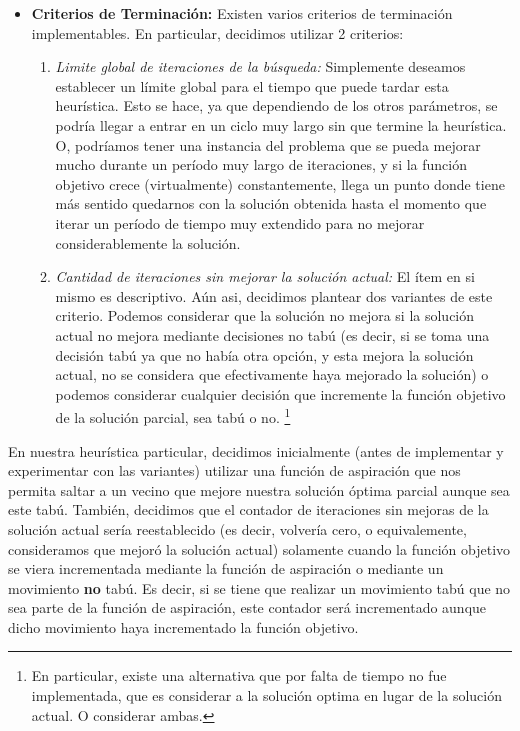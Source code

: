 \begin{itemize}
    \item \textbf{Criterios de Terminaci\'on: } Existen varios criterios
        de terminaci\'on implementables. En particular, decidimos utilizar
        2 criterios:
        \begin{enumerate}
            \item \emph{Limite global de iteraciones de la b\'usqueda: } Simplemente
                deseamos establecer un l\'imite global para el tiempo que puede
                tardar esta heur\'istica. Esto se hace, ya que dependiendo de los
                otros par\'ametros, se podr\'ia llegar a entrar en un ciclo
                muy largo sin que termine la heur\'istica. O, podr\'iamos tener
                una instancia del problema que se pueda mejorar mucho durante
                un per\'iodo muy largo de iteraciones, y si la funci\'on objetivo
                crece (virtualmente) constantemente, llega un punto donde tiene
                m\'as sentido quedarnos con la soluci\'on obtenida hasta el momento
                que iterar un per\'iodo de tiempo muy extendido para no mejorar
                considerablemente la soluci\'on.

            \item \emph{Cantidad de iteraciones sin mejorar la soluci\'on actual: } El
                \'item en si mismo es descriptivo. A\'un asi, decidimos plantear
                dos variantes de este criterio. Podemos considerar que la
                soluci\'on no mejora si la soluci\'on actual no mejora mediante
                decisiones no tab\'u (es decir, si se toma una decisi\'on tab\'u
                ya que no hab\'ia otra opci\'on, y esta mejora la soluci\'on actual,
                no se considera que efectivamente haya mejorado la soluci\'on) o
                podemos considerar cualquier decisi\'on que incremente la
                funci\'on objetivo de la soluci\'on parcial, sea tab\'u o no.%
                \footnote{En particular, existe una alternativa que por falta de
                tiempo no fue implementada, que es considerar a la soluci\'on optima
                en lugar de la soluci\'on actual. O considerar ambas.}
        \end{enumerate}
\end{itemize}

\bigskip

\par En nuestra heur\'istica particular, decidimos inicialmente (antes de implementar
    y experimentar con las variantes) utilizar una funci\'on de aspiraci\'on que nos
    permita saltar a un vecino que mejore nuestra soluci\'on \'optima parcial aunque
    sea este tab\'u. Tambi\'en, decidimos que el contador de iteraciones sin mejoras
    de la soluci\'on actual ser\'ia reestablecido (es decir, volver\'ia cero, o
    equivalemente, consideramos que mejor\'o la soluci\'on actual) solamente cuando
    la funci\'on objetivo se viera incrementada mediante la funci\'on de aspiraci\'on
    o mediante un movimiento \textbf{no} tab\'u. Es decir, si se tiene que realizar
    un movimiento tab\'u que no sea parte de la funci\'on de aspiraci\'on, este contador
    ser\'a incrementado aunque dicho movimiento haya incrementado la funci\'on objetivo.

